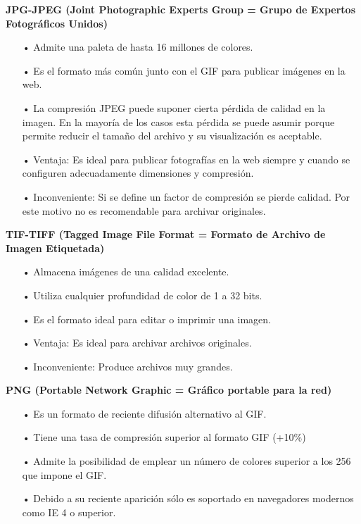 {\bf JPG-JPEG (Joint Photographic Experts Group = Grupo de Expertos Fotográficos Unidos)} \vskip 0.1cm

\begin{itemize}
\item[•] Admite una paleta de hasta 16 millones de colores.
\item[•] Es el formato más común junto con el GIF para publicar imágenes en la web.
\item[•] La compresión JPEG puede suponer cierta pérdida de calidad en la imagen. En la mayoría de los casos esta pérdida se puede asumir porque permite reducir el tamaño del archivo y su visualización es aceptable.
\item[•] Ventaja: Es ideal para publicar fotografías en la web siempre y cuando se configuren adecuadamente dimensiones y compresión.
\item[•] Inconveniente: Si se define un factor de compresión se pierde calidad. Por este motivo no es recomendable para archivar originales.
\end{itemize}

{\bf TIF-TIFF (Tagged Image File Format = Formato de Archivo de Imagen Etiquetada)} \vskip 0.1cm

\begin{itemize}
\item[•] Almacena imágenes de una calidad excelente.
\item[•] Utiliza cualquier profundidad de color de 1 a 32 bits.
\item[•] Es el formato ideal para editar o imprimir una imagen.
\item[•] Ventaja: Es ideal para archivar archivos originales.
\item[•] Inconveniente: Produce archivos muy grandes.
\end{itemize}

{\bf PNG (Portable Network Graphic = Gráfico portable para la red)} \skip 0.1cm

\begin{itemize}
\item[•] Es un formato de reciente difusión alternativo al GIF.
\item[•] Tiene una tasa de compresión superior al formato GIF (+10\%)
\item[•] Admite la posibilidad de emplear un número de colores superior a los 256 que impone el GIF.
\item[•] Debido a su reciente aparición sólo es soportado en navegadores modernos como IE 4 o superior.
\end{itemize}

